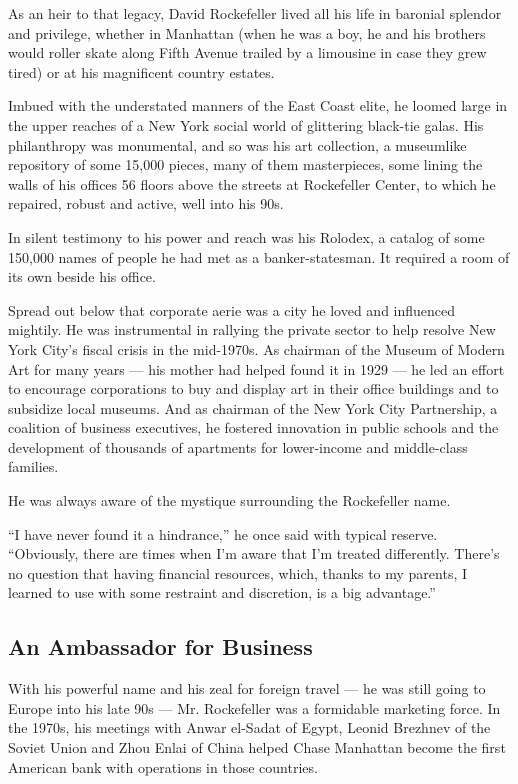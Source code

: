 As an heir to that legacy, David Rockefeller lived all his life in
baronial splendor and privilege, whether in Manhattan (when he was a
boy, he and his brothers would roller skate along Fifth Avenue trailed
by a limousine in case they grew tired) or at his magnificent country
estates.

Imbued with the understated manners of the East Coast elite, he loomed
large in the upper reaches of a New York social world of glittering
black-tie galas. His philanthropy was monumental, and so was his art
collection, a museumlike repository of some 15,000 pieces, many of them
masterpieces, some lining the walls of his offices 56 floors above the
streets at Rockefeller Center, to which he repaired, robust and active,
well into his 90s.

In silent testimony to his power and reach was his Rolodex, a catalog of
some 150,000 names of people he had met as a banker-statesman. It
required a room of its own beside his office.

Spread out below that corporate aerie was a city he loved and influenced
mightily. He was instrumental in rallying the private sector to help
resolve New York City's fiscal crisis in the mid-1970s. As chairman of
the Museum of Modern Art for many years --- his mother had helped found
it in 1929 --- he led an effort to encourage corporations to buy and
display art in their office buildings and to subsidize local museums.
And as chairman of the New York City Partnership, a coalition of
business executives, he fostered innovation in public schools and the
development of thousands of apartments for lower-income and middle-class
families.

He was always aware of the mystique surrounding the Rockefeller name.

``I have never found it a hindrance,'' he once said with typical
reserve. ``Obviously, there are times when I'm aware that I'm treated
differently. There's no question that having financial resources, which,
thanks to my parents, I learned to use with some restraint and
discretion, is a big advantage.''

\hypertarget{an-ambassador-for-business}{%
\subsection{An Ambassador for
Business}\label{an-ambassador-for-business}}

With his powerful name and his zeal for foreign travel --- he was still
going to Europe into his late 90s --- Mr. Rockefeller was a formidable
marketing force. In the 1970s, his meetings with Anwar el-Sadat of
Egypt, Leonid Brezhnev of the Soviet Union and Zhou Enlai of China
helped Chase Manhattan become the first American bank with operations in
those countries.

